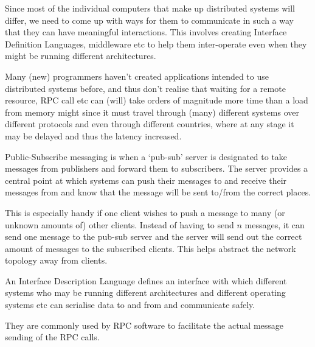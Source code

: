 
Since most of the individual computers that make up distributed systems will
differ, we need to come up with ways for them to communicate in such a way that
they can have meaningful interactions. This involves creating Interface
Definition Languages, middleware etc to help them inter-operate even when they
might be running different architectures.


Many (new) programmers haven't created applications intended to use distributed
systems before, and thus don't realise that waiting for a remote resource, RPC
call etc can (will) take orders of magnitude more time than a load from memory
might since it must travel through (many) different systems over different
protocols and even through different countries, where at any stage it may be
delayed and thus the latency increased.


Public-Subscribe messaging is when a `pub-sub' server is designated to take
messages from publishers and forward them to subscribers. The server provides a
central point at which systems can push their messages to and receive their
messages from and know that the message will be sent to/from the correct places.

This is especially handy if one client wishes to push a message to many (or
unknown amounts of) other clients. Instead of having to send $n$ messages, it
can send one message to the pub-sub server and the server will send out the
correct amount of messages to the subscribed clients. This helps abstract the
network topology away from clients.


An Interface Description Language defines an interface with which different
systems who may be running different architectures and different operating
systems etc can serialise data to and from and communicate safely.

They are commonly used by RPC software to facilitate the actual message sending
of the RPC calls.


